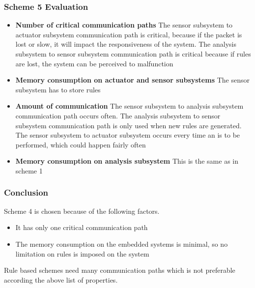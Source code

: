 \subsubsection{Scheme 5 Evaluation}
\begin{itemize}
\item \textbf{Number of critical communication paths} The sensor subsystem to actuator subsystem communication path is critical, because if the packet is lost or slow, it will impact the responsiveness of the system. The analysis subsystem to sensor subsystem communication path is critical because if rules are lost, the system can be perceived to malfunction
\item \textbf{Memory consumption on actuator and sensor subsystems} The sensor subsystem has to store rules
\item \textbf{Amount of communication} The sensor subsystem to analysis subsystem communication path occurs often. The analysis subsystem to sensor subsystem communication path is only used when new rules are generated. The sensor subsystem to actuator subsystem occurs every time an is to be performed, which could happen fairly often
\item \textbf{Memory consumption on analysis subsystem} This is the same as in scheme 1
\end{itemize}

\subsubsection{Conclusion}
Scheme 4 is chosen because of the following factors.
\begin{itemize}
\item It has only one critical communication path
\item The memory consumption on the embedded systems is minimal, so no limitation on rules is imposed on the system
\end{itemize}

Rule based schemes need many communication paths which is not preferable according the above list of properties.

